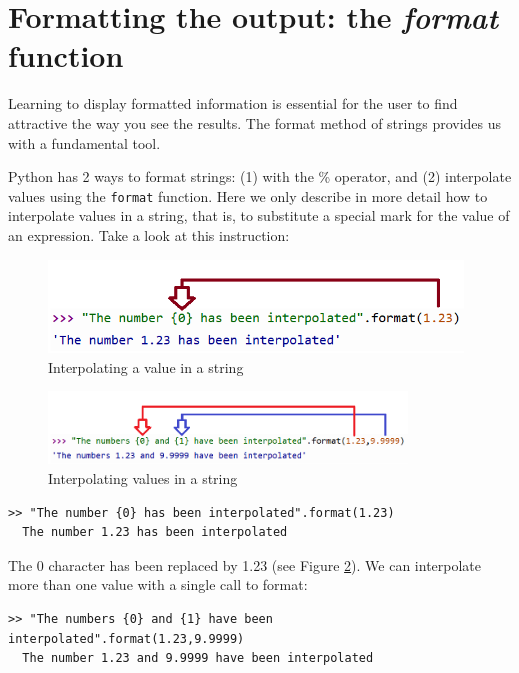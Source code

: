 \section{Formatting the output: the {\em format} function}
Learning to display formatted information is essential for the user to find
attractive the way you see the results. The format method of strings provides us with a fundamental tool.

Python has 2 ways to format strings:
(1) with the \% operator, and (2) interpolate values using the \texttt{format} function.
%
Here we only describe in more detail how to interpolate values in a string, that is, to substitute a special mark for the value of an expression. Take a look at this instruction:

\begin{figure}[h]
    \centering
    \includegraphics[width=11cm]{images/int1.png}
    \caption{Interpolating a value in a string}
    \label{fig:print-marcas}
\end{figure}

\begin{figure}[h]
    \centering
    \includegraphics[width=0.85\textwidth]{images/int2.png}
    \caption{Interpolating values in a string}
    \label{fig:print-marcas}
\end{figure}



\begin{Verbatim}[frame=single]
>> "The number {0} has been interpolated".format(1.23)
  The number 1.23 has been interpolated
\end{Verbatim}

The {0} character has been replaced by 1.23 (see Figure \ref{fig:print-marcas}).
%
We can interpolate more than one value with a single call to format:

\begin{Verbatim}[frame=single]
>> "The numbers {0} and {1} have been interpolated".format(1.23,9.9999)
  The number 1.23 and 9.9999 have been interpolated
\end{Verbatim}

